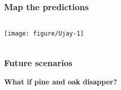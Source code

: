 \documentclass[color=usenames,dvipsnames]{beamer}\usepackage[]{graphicx}\usepackage[]{color}
\begin{document}
\begin{frame}[fragile]
  \frametitle{Map the predictions}
  \scriptsize

\begin{columns}
  \column{\dimexpr\paperwidth-10pt}
  \texttt{[image: figure/Ujay-1]}
\end{columns}
\end{frame}







\begin{frame}[fragile]
  \frametitle{Future scenarios}
  {\bf What if pine and oak disapper? \par}
  \scriptsize


\begin{columns}
  \column{\dimexpr\paperwidth-10pt}
\end{columns}
\end{frame}





\end{document}

